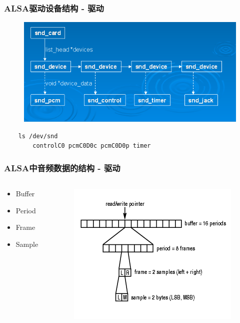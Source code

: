 \documentclass[CJK]{beamer}
\begin{document}
\begin{frame}[fragile]
    \frametitle{ALSA驱动设备结构 - 驱动}
    \begin{figure}
        \includegraphics[height=120bp]{"alsa_devices.png"}
    \end{figure}
    \begin{verbatim}
    ls /dev/snd
        controlC0 pcmC0D0c pcmC0D0p timer
    \end{verbatim}
\end{frame}

\begin{frame}
    \frametitle{ALSA中音频数据的结构 - 驱动}
    \begin{columns}
        \begin{column}{0.3\textwidth}
            \begin{itemize}
                \item Buffer 
                \item Period
                \item Frame
                \item Sample
            \end{itemize}
        \end{column}
        \begin{column}{0.5\textwidth}
            \begin{figure}
                \includegraphics[height=150bp]{"alsa_data.jpg"}
            \end{figure}
        \end{column}
    \end{columns}
\end{frame}
\end{document}
